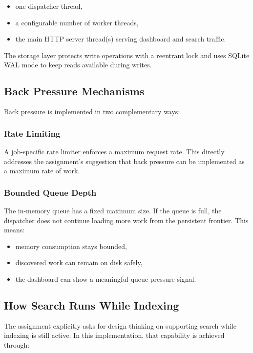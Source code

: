 \documentclass[pdftex,12pt,a4paper]{article}
\begin{document}
\begin{itemize}
    \item one dispatcher thread,
    \item a configurable number of worker threads,
    \item the main HTTP server thread(s) serving dashboard and search traffic.
\end{itemize}

The storage layer protects write operations with a reentrant lock and uses SQLite WAL mode to keep reads available during writes.

\subsection{Back Pressure Mechanisms}

Back pressure is implemented in two complementary ways:

\subsubsection{Rate Limiting}

A job-specific rate limiter enforces a maximum request rate. This directly addresses the assignment's suggestion that back pressure can be implemented as a maximum rate of work.

\subsubsection{Bounded Queue Depth}

The in-memory queue has a fixed maximum size. If the queue is full, the dispatcher does not continue loading more work from the persistent frontier. This means:

\begin{itemize}
    \item memory consumption stays bounded,
    \item discovered work can remain on disk safely,
    \item the dashboard can show a meaningful queue-pressure signal.
\end{itemize}

\subsection{How Search Runs While Indexing}

The assignment explicitly asks for design thinking on supporting search while indexing is still active. In this implementation, that capability is achieved through:
\end{document}
